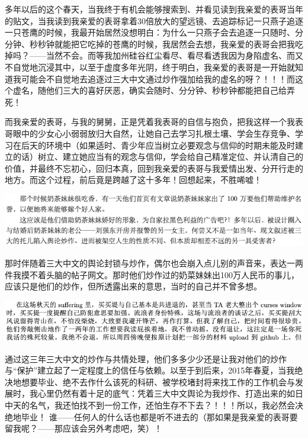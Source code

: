 \documentclass[9pt, b5paper]{article}
\begin{document}
多年以后的这个春天，当我终于有机会能够搜索到、并看见读到我亲爱的表哥当年的贴文，当我读到我亲爱的表哥拿着30倍放大的望远镜、去追踪标记一只燕子追逐一只苍鹰的时候，我最开始居然没想明白：为什么一只燕子会去追逐一只随时、分分钟、秒秒钟就能把它吃掉的苍鹰的时候，我居然会去想，我亲爱的表哥会把我吃掉吗？——当然不会。而等我加州硅谷红尘看尽、看尽看透我因为身陷虚名、而又不自觉地沉浸其中，以至于虚度多年光阴，终于明白，我亲爱的表哥是一开始就知道我可能会不自觉地去追逐过三大中文通过炒作强加给我的虚名的呀？！！！而这个虚名，随他们三大的喜好厌恶，确实会随时、分分钟、秒秒钟都能把自己给弄死！

而我亲爱的表哥，与我的舅舅，正是凭着我表哥的自信与抱负，把我这样一个我表哥眼中的少女心小弱弱放归大自然，让她自己去学习扎根土壤、学会生存竞争、学习在后天的环境中（如果适时、青少年应当树立必要观念与信仰的时期未能及时建立的话）树立、建立她应当有的观念与信仰，学会给自己精准定位、并认清自己的价值，并最终不忘初心，回归本真，回到我亲爱的表哥与我爱情出发、分开行走的地方。而这个过程，前后竟是跨越了这十多年！回想起来，不胜唏嘘！

\begin{center}
\includegraphics[width=.9\linewidth]{./pic/backups_plans_20210424_100357.png}
\end{center}

那时伴随着三大中文的舆论封锁与炒作，偶尔也会崩入点儿别的声音来，表达一两件我摸不着头脑的帖子网文。那时他们炒作过的奶菜妹妹出100万人民币的事儿，应该只是他们的炒作，但所透露出来的意思，当时的自己并不曾多想。 

\begin{center}
\includegraphics[width=.9\linewidth]{./pic/backups_plans_20210424_103217.png}
\end{center}

通过这三年三大中文的炒作与共情处理，他们多多少少还是让我对他们的炒作与“保护”建立起了一定程度上的信任与依赖。以至于到后来，2015年春夏，当我绝决地想要毕业、绝不去作什么该死的科研、被学校堵封将来找工作的工作机会与发展时，我心里仍然有着十足的底气：凭着三大中文舆论为我炒作、打造出来的如日中天的名气，我还怕找不到一份工作，还怕生存不下去？！！！所以，我必然会决绝地毕业！ 谁——任何人的什么话也都是听不进去的（那如果是我亲爱的表哥要留我呢？——那应该会另外考虑吧，笑）！
\end{document}
